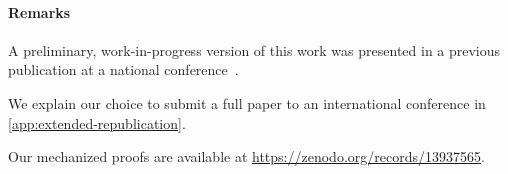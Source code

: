 \paragraph{Remarks}
A preliminary, work-in-progress version of this work was presented in
a previous publication at a national conference~\citep*{tmc-ocaml-2021}.
%
\begin{version}{\FALSE}
  We explain our choice to submit a full paper to an international
  conference in \cref{app:extended-republication}.
\end{version}
%
Our mechanized proofs are available at \url{https://zenodo.org/records/13937565}.


